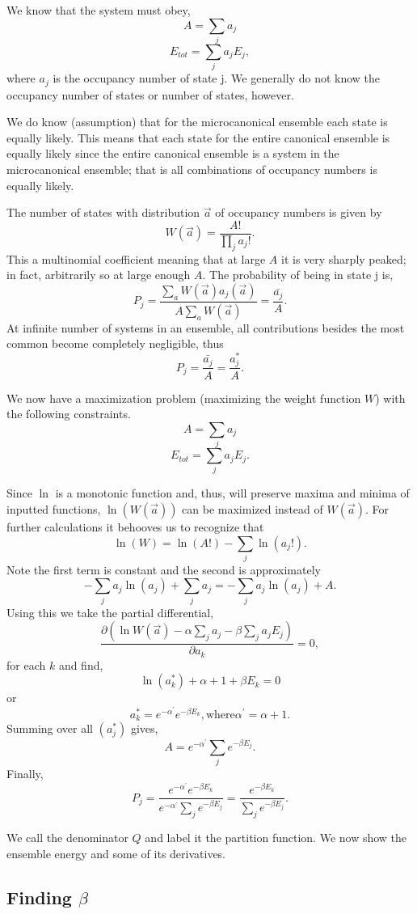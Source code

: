 We know that the system must obey,
\[ A = \sum_j{a_j} \]\[ E_{tot} = \sum_j{a_j E_j},\]
where  $a_j$ is the occupancy number of state j. We generally do not know the
occupancy number of states or number of states, however.

We do know (assumption) that for the microcanonical ensemble each state is
equally likely. This means that each state for the entire canonical ensemble is
equally likely since the entire canonical ensemble is a system in the
microcanonical ensemble; that is all combinations of occupancy numbers is
equally likely.

The number of states with distribution $\vec{a}$ of occupancy numbers is given
by
\[ W(\vec{a}) = \frac{A!}{ \prod_{j}{a_j!}}.\]
This a multinomial coefficient meaning that at large $A$ it is very sharply
peaked; in fact, arbitrarily so at large enough $A$. The probability of being in
state j is,
\[ P_j =  \frac{\sum_a{W(\vec{a})a_j(\vec{a})}}{A \sum_a{W(\vec{a})}}
= \frac{\bar{a_j}}{A}.\]
At infinite number of systems in an ensemble, all contributions besides the most
common become completely negligible, thus
\[ P_j = \frac{\bar{a_j}}{A} = \frac{a_j^{*}}{A}.\] 

We now have a maximization problem (maximizing the weight function $W$) with the
following constraints.
\[ A = \sum_{j}{a_j} \]
\[ E_{tot} = \sum_{j}{a_j E_j}.\]

Since $\ln$ is a monotonic function and, thus, will preserve maxima and minima of
inputted functions, $\ln(W(\vec{a}))$ can be maximized instead of $W(\vec{a})$.
For further calculations it behooves us to recognize that
\[ \ln(W) = \ln(A!) - \sum_j{\ln(a_j!)}.\]
Note the first term is constant and the second is approximately
\[-\sum_j{a_j \ln(a_j)} + \sum_{j}{a_j} = -\sum_j{a_j \ln(a_j)} + A.\]
Using this we take the partial differential,
\[ \frac{\partial ( \ln W(\vec{a}) - \alpha \sum_{j}{a_j} - \beta \sum_j{a_j
E_j})}{\partial a_{k}} = 0, \]
for each $k$ and find,
\[ \ln(a^*_k)+ \alpha + 1 + \beta E_k = 0 \]
or
\[ a_k^* = e^{-\alpha^{'}}e^{-\beta E_{k}}, \text{where} \alpha^{'} = \alpha +
1. \]
Summing over all $(a_j^*)$ gives,
\[ A = e^{ -\alpha^{'}}\sum_{j}{e^{ - \beta E_j}}. \]
Finally,
\[ P_j = \frac{e^{-\alpha^{'}}e^{-\beta E_{k}}}{e^{ -\alpha^{'}}\sum_j{e^{
-\beta E_{j}}}} = \frac{e^{-\beta E_k}}{\sum_j{e^{ -\beta E_j}}}.\]

We call the denominator $Q$ and label it the partition function. We now show
the ensemble energy and some of its derivatives.

\subsection{Finding $\beta$}

